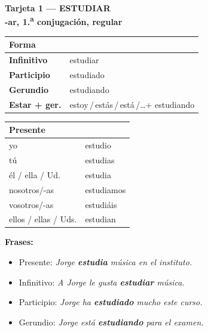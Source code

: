 \documentclass[a4paper,10pt]{article}
\newcommand{\verboheader}[3]{%
  \noindent
  \colorbox{azulverbo!90}{\parbox{\dimexpr\linewidth-2\fboxsep}{%
    \centering\color{white}\bfseries\large Tarjeta #1 --- #2\\[2pt]
    \normalsize #3%
  }}
  \vspace{4pt}
}
\begin{document}
\newpage


\verboheader{1}{ESTUDIAR}{-ar, 1.\textsuperscript{a} conjugación, regular}

\begin{minipage}[t]{0.48\linewidth}
\small
\begin{tabular}{|>{\bfseries}l|l|}
\hline
\rowcolor{azulverbo!15} Forma & \\
\hline
Infinitivo & estudiar \\
\hline
\rowcolor{grisclaro}
Participio & estudiado \\
\hline
Gerundio & estudiando \\
\hline
\rowcolor{grisclaro}
Estar + ger. & estoy\,/\,estás\,/\,está\,/\ldots\;+ estudiando \\
\hline
\end{tabular}
\end{minipage}
\hfill
\begin{minipage}[t]{0.48\linewidth}
\small
\begin{tabular}{|l|l|}
\hline
\rowcolor{azulverbo!15} \textbf{Presente} & \\
\hline
yo & estudio \\
\hline
\rowcolor{grisclaro}
tú & estudias \\
\hline
él / ella / Ud. & estudia \\
\hline
\rowcolor{grisclaro}
nosotros/-as & estudiamos \\
\hline
vosotros/-as & estudiáis \\
\hline
\rowcolor{grisclaro}
ellos / ellas / Uds. & estudian \\
\hline
\end{tabular}
\end{minipage}

\vspace{4pt}
\small
\textbf{Frases:}
\begin{itemize}[nosep, leftmargin=1em]
\item Presente: \textit{Jorge \textbf{estudia} música en el instituto.}
\item Infinitivo: \textit{A Jorge le gusta \textbf{estudiar} música.}
\item Participio: \textit{Jorge ha \textbf{estudiado} mucho este curso.}
\item Gerundio: \textit{Jorge está \textbf{estudiando} para el examen.}
\end{itemize}
\end{document}
